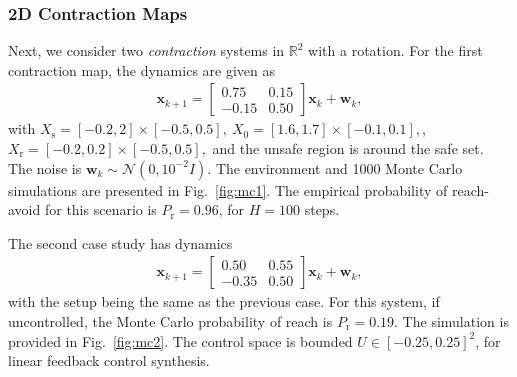\documentclass[journal,twoside,web]{ieeecolor}
\newcommand{\safe}{\mathrm{s}}
\newcommand{\reach}{\mathrm{r}}
\newcommand{\initial}{\mathrm{0}}
\newcommand{\pw}{\mathbf{w}}
\newcommand{\px}{\mathbf{x}}
\newcommand{\reals}{\mathbb{R}}
\newcommand{\N}{\mathcal{N}}
\theoremstyle{definition}
\theoremstyle{plain}
\theoremstyle{plain}
\begin{document}
\subsubsection{2D Contraction Maps}

Next, we consider two \emph{contraction} systems in $\reals^{2}$ with a rotation. For the first contraction map, the dynamics are given as
\begin{align}
    \label{eq:contraction_map_1}
    \px_{k+1} =
    \begin{bmatrix}
        0.75 & 0.15\\
        -0.15 & 0.50
    \end{bmatrix}\px_k + \pw_k,
\end{align}
with $X_{\safe} = [-0.2, 2]\times[-0.5, 0.5],~X_{\initial} = [1.6, 1.7]\times[-0.1, 0.1],$, $X_{\reach} = [-0.2, 0.2]\times[-0.5, 0.5],$ and the unsafe region is around the safe set.  The noise is $\pw_k \sim \N(0, 10^{-2} I)$. The environment and 1000 Monte Carlo simulations are presented in Fig.~\ref{fig:mc1}. The empirical probability of reach-avoid for this scenario is $P_\reach = 0.96$, for $H=100$ steps.

The second case study has dynamics
\begin{align}
    \label{eq:contraction_map_2}
    \px_{k+1} =
    \begin{bmatrix}
        0.50 & 0.55\\
        -0.35 & 0.50
    \end{bmatrix}\px_k + \pw_k,
\end{align}
with the setup being the same as the previous case. For this system, if uncontrolled, the Monte Carlo probability of reach is $P_\reach = 0.19$. The simulation is provided in Fig.~\ref{fig:mc2}. The control space is bounded $U \in [-0.25, 0.25]^2$, for linear feedback control synthesis.
\end{document}
